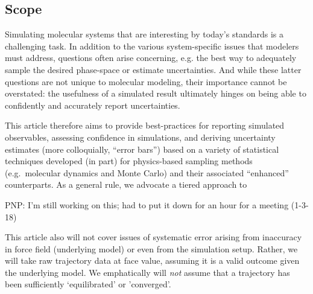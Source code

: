 \subsection{Scope}

Simulating molecular systems that are interesting by today's standards is a challenging task.  In addition to the various system-specific issues that modelers must address, questions often arise concerning, e.g. the best way to adequately sample the desired phase-space or estimate uncertainties.  And while these latter questions are not unique to molecular modeling, their importance cannot be overstated: the usefulness of a simulated result ultimately hinges on being able to confidently and accurately report uncertainties.  

This article therefore aims to provide best-practices for reporting simulated observables, assessing confidence in simulations, and deriving uncertainty estimates (more colloquially, ``error bars'') based on a variety of statistical techniques developed (in part) for physics-based sampling methods (e.g.\ molecular dynamics and Monte Carlo) and their associated ``enhanced'' counterparts.  As a general rule, we advocate a tiered approach to 

PNP: I'm still working on this; had to put it down for an hour for a meeting (1-3-18)



This article also will not cover issues of systematic error arising from inaccuracy in force field (underlying model) or even from the simulation setup.
Rather, we will take raw trajectory data at face value, assuming it is a valid outcome given the underlying model.
We emphatically will \emph{not} assume that a trajectory has been sufficiently `equilibrated' or 'converged'.
